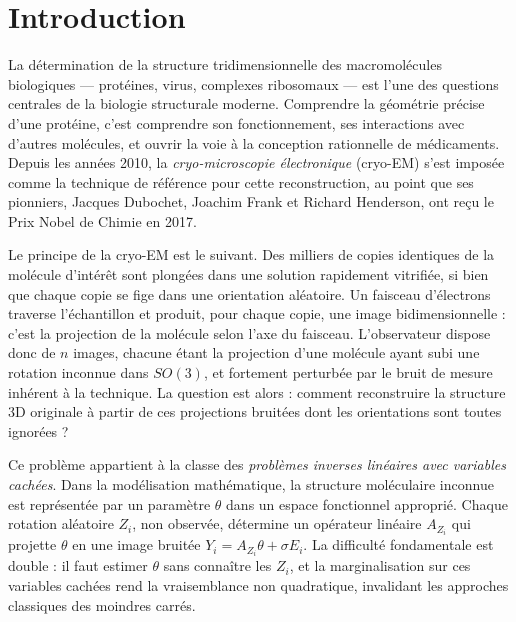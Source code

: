 \documentclass[12pt, a4paper]{article}
\theoremstyle{definition}
\begin{document}
\newpage
\tableofcontents

\newpage
\section*{Introduction}
\label{sec:introduction}

La détermination de la structure tridimensionnelle des macromolécules biologiques
--- protéines, virus, complexes ribosomaux --- est l'une des questions centrales
de la biologie structurale moderne. Comprendre la géométrie précise d'une protéine,
c'est comprendre son fonctionnement, ses interactions avec d'autres molécules, et
ouvrir la voie à la conception rationnelle de médicaments. Depuis les années 2010,
la \textit{cryo-microscopie électronique} (cryo-EM) s'est imposée comme la technique
de référence pour cette reconstruction, au point que ses pionniers, Jacques Dubochet,
Joachim Frank et Richard Henderson, ont reçu le Prix Nobel de Chimie en 2017.

Le principe de la cryo-EM est le suivant. Des milliers de copies identiques de la
molécule d'intérêt sont plongées dans une solution rapidement vitrifiée, si bien que
chaque copie se fige dans une orientation aléatoire. Un faisceau d'électrons traverse
l'échantillon et produit, pour chaque copie, une image bidimensionnelle : c'est la
projection de la molécule selon l'axe du faisceau. L'observateur dispose donc de
$n$ images, chacune étant la projection d'une molécule ayant subi une rotation
inconnue dans $SO(3)$, et fortement perturbée par le bruit de mesure inhérent à la
technique. La question est alors : comment reconstruire la structure 3D originale
à partir de ces projections bruitées dont les orientations sont toutes ignorées ?

Ce problème appartient à la classe des \textit{problèmes inverses linéaires avec
variables cachées}. Dans la modélisation mathématique, la structure moléculaire
inconnue est représentée par un paramètre $\theta$ dans un espace fonctionnel
approprié. Chaque rotation aléatoire $Z_i$, non observée, détermine un opérateur
linéaire $A_{Z_i}$ qui projette $\theta$ en une image bruitée $Y_i = A_{Z_i}\theta
+ \sigma E_i$. La difficulté fondamentale est double : il faut estimer $\theta$
sans connaître les $Z_i$, et la marginalisation sur ces variables cachées rend la
vraisemblance non quadratique, invalidant les approches classiques des moindres carrés.
\end{document}
